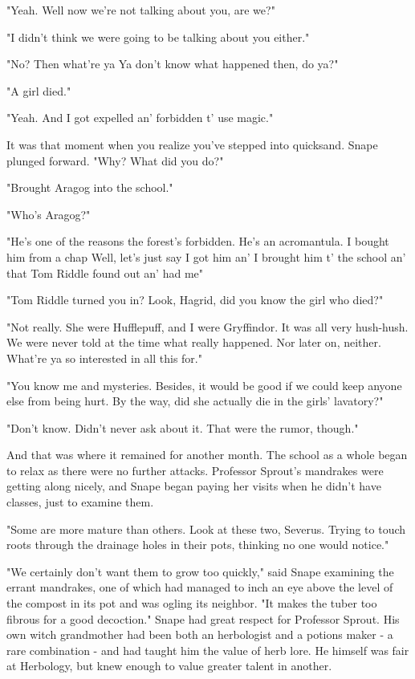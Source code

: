 "Yeah. Well now we're not talking about you, are we?"

"I didn't think we were going to be talking about you either."

"No? Then what're ya{\el} Ya don't know what happened then, do ya?"

"A girl died."

"Yeah. And I got expelled an' forbidden t' use magic."

It was that moment when you realize you've stepped into quicksand. Snape plunged forward. "Why? What did you do?"

"Brought Aragog into the school."

"Who's Aragog?"

"He's one of the reasons the forest's forbidden. He's an acromantula. I bought him from a chap{\el} Well, let's just say I got him an' I brought him t' the school an' that Tom Riddle found out an' had me{\el}"

"Tom Riddle turned you in? Look, Hagrid, did you know the girl who died?"

"Not really. She were Hufflepuff, and I were Gryffindor. It was all very hush-hush. We were never told at the time what really happened. Nor later on, neither. What're ya so interested in all this for."

"You know me and mysteries. Besides, it would be good if we could keep anyone else from being hurt. By the way, did she actually die in the girls' lavatory?"

"Don't know. Didn't never ask about it. That were the rumor, though."

And that was where it remained for another month. The school as a whole began to relax as there were no further attacks. Professor Sprout's mandrakes were getting along nicely, and Snape began paying her visits when he didn't have classes, just to examine them.

"Some are more mature than others. Look at these two, Severus. Trying to touch roots through the drainage holes in their pots, thinking no one would notice."

"We certainly don't want them to grow too quickly," said Snape examining the errant mandrakes, one of which had managed to inch an eye above the level of the compost in its pot and was ogling its neighbor. "It makes the tuber too fibrous for a good decoction." Snape had great respect for Professor Sprout. His own witch grandmother had been both an herbologist and a potions maker - a rare combination - and had taught him the value of herb lore. He himself was fair at Herbology, but knew enough to value greater talent in another.

